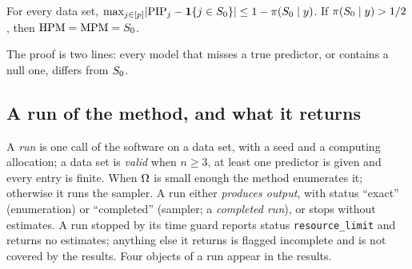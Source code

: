 \begin{lemma}\label{lem:summaries}
For every data set, $\max_{j\in[p]}\lvert \mathrm{PIP}_j-\mathbf{1}\{j\in S_0\}\rvert\le1-\pi(S_0\mid y)$. If $\pi(S_0\mid y)>1/2$, then
$\mathrm{HPM}=\mathrm{MPM}=S_0$.
\end{lemma}

The proof is two lines: every model that misses a true predictor, or contains a null one, differs from $S_0$.

\subsection{A run of the method, and what it returns}\label{sec:method}

A \emph{run} is one call of the software on a data set, with a seed and a computing allocation; a data set is
\emph{valid} when $n\ge3$, at least one predictor is given and every entry is finite. When $\Omega$ is small enough the
method enumerates it; otherwise it runs the sampler. A run either \emph{produces output}, with status ``exact''
(enumeration) or ``completed'' (sampler; a \emph{completed run}), or stops without estimates. A run stopped by its time guard reports status \texttt{resource\_limit} and returns no
estimates; anything else it returns is flagged incomplete and is not covered by the results. Four objects of a run appear
in the results.

